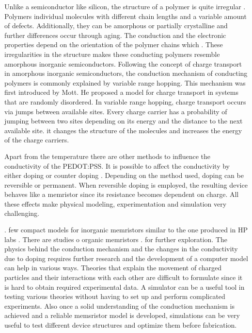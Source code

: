 \begin{doublespace}
Unlike a semiconductor like silicon, the structure of a polymer is quite irregular \cite{PedotBook}. Polymers  individual molecules with different chain lengths and a variable amount of defects. Additionally, they can be amorphous or partially crystalline and further differences occur through aging. The conduction and the electronic properties depend on the orientation of the polymer chains which . These irregularities in the structure makes these conducting polymers resemble amorphous inorganic semiconductors. Following the concept of charge transport in amorphous inorganic semiconductors, the conduction mechanism of conducting polymers is commonly explained by variable range hopping. This mechanism was first introduced by Mott\cite{Mott}. He proposed a model for charge transport in systems that are randomly disordered. In variable range hopping, charge transport occurs via jumps between available sites. Every charge carrier has a probability of jumping between two sites depending on its energy and the distance to the next available site.  it changes the structure of the molecules and increases the energy of the charge carriers.

Apart from the temperature there are other methods to influence the conductivity of the PEDOT:PSS. It is possible to affect the conductivity by either doping or counter doping \cite{PedotDope}. Depending on the method used, doping can be reversible or permanent. When reversible doping is employed, the resulting device behaves like a memristor since its resistance becomes dependent on charge. All these effects make physical modeling, experimentation and simulation very challenging. 

.  few compact models for inorganic memristors similar to the one produced in HP labs  \cite{ChuaSim}\cite{MemCircuitSim}\cite{MemTiO2}. There are  studies o organic memristors \cite{OrganicMemSim}\cite{OrganicMem}.   for further exploration. The physics behind the conduction mechanism and the changes in the conductivity due to doping requires further research and the development of a computer model can help in various ways. Theories that explain the movement of charged particles and their interactions with each other are difficult to formulate since it is hard to obtain required experimental data. A simulator can be a useful tool in testing various theories without having to set up and perform complicated experiments. Also once a solid understanding of the conduction mechanism is achieved and a reliable memsristor model is developed, simulations can be very useful to test different device structures and optimize them before fabrication. 


 \end{doublespace}